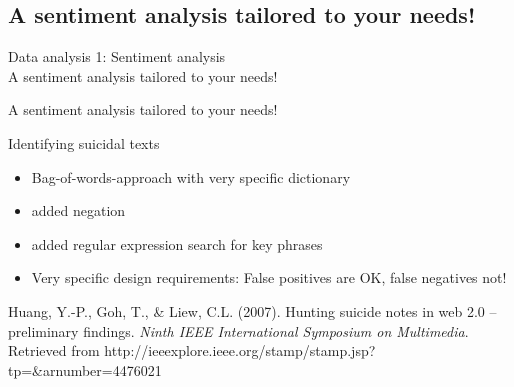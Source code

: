\documentclass{beamer}
\begin{document}
\subsection{A sentiment analysis tailored to your needs!}
\begin{frame}
Data analysis 1: Sentiment analysis\\
A sentiment analysis tailored to your needs!
\end{frame}




\begin{frame}{A sentiment analysis tailored to your needs!}
\begin{block}{Identifying suicidal texts}
\begin{itemize}
\item Bag-of-words-approach with very specific dictionary
\item added negation
\item added regular expression search for key phrases
\item Very specific design requirements: False positives are OK, false negatives not!
\end{itemize}
\end{block}
\par
\tiny{Huang, Y.-P., Goh, T., \& Liew, C.L. (2007). Hunting suicide notes in web 2.0 – preliminary findings. \emph{Ninth IEEE International Symposium on Multimedia}. Retrieved from http://ieeexplore.ieee.org/stamp/stamp.jsp?tp=\&arnumber=4476021}\\
\end{frame}
\end{document}
